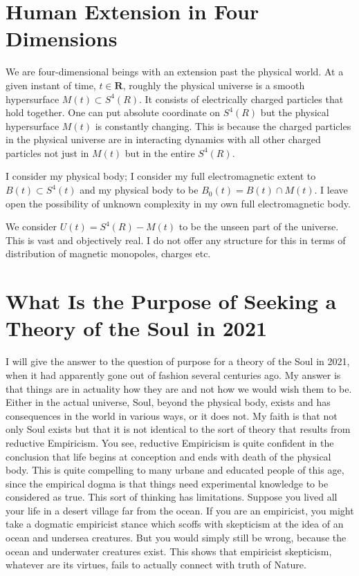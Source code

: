 \documentclass{amsart}
\begin{document}
\section{Human Extension in Four Dimensions}

We are four-dimensional beings with an extension past the physical world.  At a given instant of time, $t\in \mathbf{R}$, roughly the physical universe is a smooth hypersurface $M(t) \subset S^4(R)$.  It consists of electrically charged particles that hold together.  One can put absolute coordinate on $S^4(R)$ but the physical hypersurface $M(t)$ is constantly changing.  This is because the charged particles in the physical universe are in interacting dynamics with all other charged particles not just in $M(t)$ but in the entire $S^4(R)$.

I consider my physical body; I consider my full electromagnetic extent to $B(t) \subset S^4(t)$ and my physical body to be $B_0(t) = B(t) \cap M(t)$.  I leave open the possibility of unknown complexity in my own full electromagnetic body.  

We consider $U(t) = S^4(R) - M(t)$ to be the unseen part of the universe.  This is vast and objectively real.  I do not offer any structure for this in terms of distribution of magnetic monopoles, charges etc.

\section{What Is the Purpose of Seeking a Theory of the Soul in 2021}

I will give the answer to the question of purpose for a theory of the Soul in 2021, when it had apparently gone out of fashion several centuries ago.  My answer is that things are in actuality how they are and not how we would wish them to be.  Either in the actual universe, Soul, beyond the physical body, exists and has consequences in the world in various ways, or it does not.  My faith is that not only Soul exists but that it is not identical to the sort of theory that results from reductive Empiricism.  You see, reductive Empiricism is quite confident in the conclusion that life begins at conception and ends with death of the physical body.  This is quite compelling to many urbane and educated people of this age, since the empirical dogma is that things need experimental knowledge to be considered as true.  This sort of thinking has limitations.  Suppose you lived all your life in a desert village far from the ocean.  If you are an empiricist, you might take a dogmatic empiricist stance which scoffs with skepticism at the idea of an ocean and undersea creatures.  But you would simply still be wrong, because the ocean and underwater creatures exist.  This shows that empiricist skepticism, whatever are its virtues, fails to actually connect with truth of Nature.
\end{document}
